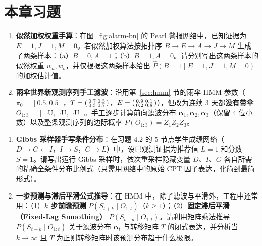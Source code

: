 \section{本章习题}\label{sec:ch5-ex}


\begin{enumerate}[label=\textbf{5.\arabic*}]
  \item \textbf{似然加权权重手算}：在图~\ref{fig:alarm-bn} 的 Pearl 警报网络中，已知证据为 $E = 1, J = 1, M = 0$。若似然加权算法按拓扑序 $B \to E \to A \to J \to M$ 生成了两条样本：（a）$B=0, A=1$；（b）$B=1, A=0$。请分别写出这两条样本的似然权重 $w_a, w_b$，并仅根据这两条样本给出 $\hat{P}(B=1 \mid E=1, J=1, M=0)$ 的加权估计值。

  \item \textbf{雨伞世界新观测序列手工滤波}：沿用第~\ref{sec:hmm} 节的雨伞 HMM 参数（$\pi_0=[0.5, 0.5]$，$T=\begin{psmallmatrix}0.7&0.3\\0.3&0.7\end{psmallmatrix}$，$E=\begin{psmallmatrix}0.9&0.1\\0.2&0.8\end{psmallmatrix}$），但改为连续 3 天都\textbf{没有带伞} $O_{1:3} = [\neg\text{U}, \neg\text{U}, \neg\text{U}]$。手工逐步计算前向滤波分布 $\boldsymbol{\alpha}_1, \boldsymbol{\alpha}_2, \boldsymbol{\alpha}_3$（保留 4 位小数）以及整条观测序列的边际概率 $P(O_{1:3}) = Z_1 Z_2 Z_3$。
\end{enumerate}


\begin{enumerate}[label=\textbf{5.\arabic*}, resume]
  \item \textbf{Gibbs 采样器手写条件分布}：在习题 4.2 的 5 节点学生成绩网络（$D \to G \leftarrow I$，$I \to S$，$G \to L$）中，设已观测证据为推荐信 $L=1$ 和分数 $S=1$。请写出运行 Gibbs 采样时，依次重采样隐藏变量 $D$、$I$、$G$ 各自所需的精确全条件分布比例式（只需用网络中的原始 CPT 因子表达，化简到最简形式）。

  \item \textbf{一步预测与滞后平滑公式推导}：在 HMM 中，除了滤波与平滑外，工程中还常用：（1）\textbf{$k$ 步前瞻预测} $P(S_{t+k} \mid O_{1:t})$（$k \ge 1$）；（2）\textbf{固定滞后平滑（Fixed-Lag Smoothing）} $P(S_{t-d} \mid O_{1:t})$。请利用矩阵乘法推导 $P(S_{t+k} \mid O_{1:t})$ 关于滤波分布 $\boldsymbol{\alpha}_t$ 与转移矩阵 $T$ 的闭式表达，并分析当 $k \to \infty$ 且 $T$ 为正则转移矩阵时该预测分布趋于什么极限。
\end{enumerate}


